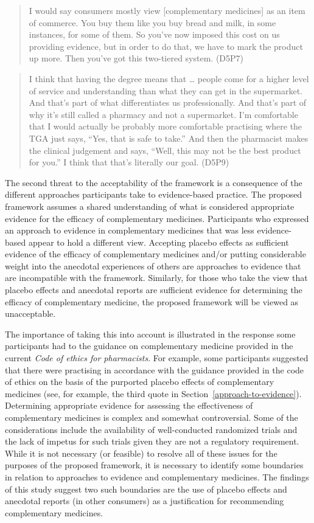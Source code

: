 \documentclass[11pt,a4paper]{article}
\begin{document}
\begin{quote}
I would say consumers mostly view {[}complementary medicines{]} as an
item of commerce. You buy them like you buy bread and milk, in some
instances, for some of them. So you've now imposed this cost on us
providing evidence, but in order to do that, we have to mark the product
up more. Then you've got this two-tiered system. (D5P7)
\end{quote}

\begin{quote}
I think that having the degree means that \ldots{} people come for a
higher level of service and understanding than what they can get in the
supermarket. And that's part of what differentiates us professionally.
And that's part of why it's still called a pharmacy and not a
supermarket. I'm comfortable that I would actually be probably more
comfortable practising where the TGA just says, ``Yes, that is safe to
take.'' And then the pharmacist makes the clinical judgement and says,
``Well, this may not be the best product for you.'' I think that that's
literally our goal. (D5P9)
\end{quote}

The second threat to the acceptability of the framework is a consequence
of the different approaches participants take to evidence-based
practice. The proposed framework assumes a shared understanding of what
is considered appropriate evidence for the efficacy of complementary
medicines. Participants who expressed an approach to evidence in
complementary medicines that was less evidence-based appear to hold a
different view. Accepting placebo effects as sufficient evidence of the
efficacy of complementary medicines and/or putting considerable weight
into the anecdotal experiences of others are approaches to evidence that
are incompatible with the framework. Similarly, for those who take the
view that placebo effects and anecdotal reports are sufficient evidence
for determining the efficacy of complementary medicine, the proposed
framework will be viewed as unacceptable.

The importance of taking this into account is illustrated in the
response some participants had to the guidance on complementary medicine
provided in the current \emph{Code of ethics for pharmacists}. For
example, some participants suggested that there were practising in
accordance with the guidance provided in the code of ethics on the basis
of the purported placebo effects of complementary medicines (see, for
example, the third quote in Section~\ref{approach-to-evidence}).
Determining appropriate evidence for assessing the effectiveness of
complementary medicines is complex and somewhat controversial. Some of
the considerations include the availability of well-conducted randomized
trials and the lack of impetus for such trials given they are not a
regulatory requirement. While it is not necessary (or feasible) to
resolve all of these issues for the purposes of the proposed framework,
it is necessary to identify some boundaries in relation to approaches to
evidence and complementary medicines. The findings of this study suggest
two such boundaries are the use of placebo effects and anecdotal reports
(in other consumers) as a justification for recommending complementary
medicines.
\end{document}
